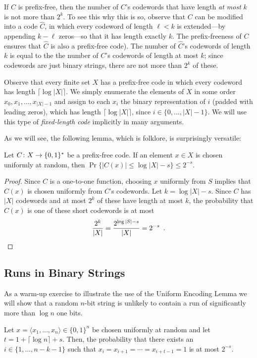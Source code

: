 \documentclass[lotsofwhite]{patmorin}
\begin{document}
If $C$ is prefix-free, then the number of $C$'s codewords that have length
\emph{at most} $k$ is not more than $2^k$. To see this why this is so,
observe that $C$ can be modified into a code $\hat C$, in which every
codeword of length $\ell <k$ is extended---by appending $k-\ell$ zeros---so that
it has length exactly $k$. The prefix-freeness of $C$ ensures that $\hat
C$ is also a prefix-free code). The number of $\hat C$'s codewords of
length $k$ is equal to the the number of $C$'s codewords of length at
most $k$; since codewords are just binary strings, there are not more
than $2^k$ of these.

Observe that every finite set $X$ has a prefix-free code in which every
codeword has length $\lceil\log |X|\rceil$. We simply enumerate the
elements of $X$ in some order $x_0,x_1,\ldots,x_{|X|-1}$ and assign to
each $x_i$ the binary representation of $i$ (padded with leading zeros),
which has length $\lceil\log |X|\rceil$, since $i\in\{0,\ldots,|X|-1\}$.
We will use this type of \emph{fixed-length code} implicitly in many arguments.

As we will see, the following lemma, which is folklore, is surprisingly
versatile:
\begin{lem}
  Let $C\colon X\to \{0,1\}^*$ be a prefix-free code. If an element $x\in
  X$ is chosen uniformly at random, then $\Pr\{|C(x)|\le \log|X|-s\}\le
  2^{-s}$.
\end{lem}

\begin{proof}
  Since $C$ is a one-to-one function, choosing $x$ uniformly from $S$
  implies that $C(x)$ is chosen uniformly from $C$'s codewords. Let
  $k=\log|X|-s$. Since $C$ has $|X|$ codewords and at most $2^{k}$ of these
  have length at most $k$, the probability that $C(x)$ is one of these 
  short codewords is at most
  \[
     \frac{2^k}{|X|} = \frac{2^{\log|S|-s}}{|X|} = 2^{-s} \enspace . \qedhere 
  \]
\end{proof}

\subsection{Runs in Binary Strings}

As a warm-up exercise to illustrate the use of the Uniform Encoding
Lemma we will show that a random $n$-bit string is unlikely to contain
a run of significantly more than $\log n$ one bits.

\begin{thm}
  Let $x=\langle x_1,\ldots,x_n\rangle\in\{0,1\}^n$ be chosen
  uniformly at random and let $t=1+\lceil\log n\rceil + s$. Then, the
  probability that there exists an $i\in\{1,\ldots,n-k-1\}$ such that
  $x_i=x_{i+1}=\cdots=x_{i+t-1}=1$ is at most $2^{-s}$.
\end{thm}
\end{document}
